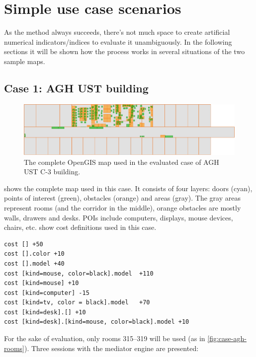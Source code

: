 \chapter{Simple use case scenarios}
\label{cha:examples}

As the method always succeeds, there's not much space to create artificial numerical indicators/indices to evaluate it unambiguously. In the following sections it will be shown how the process works in several situations of the two sample maps.

\section{Case 1: AGH UST building}
\label{sec:case-agh}

\begin{figure}
	\centering
	\includegraphics[width=\textwidth]{case-agh-complete}
	\caption{The complete OpenGIS map used in the evaluated case of AGH UST C-3 building.}
	\label{fig:case-agh-complete}
\end{figure}

 shows the complete map used in this case. It consists of four layers: doors (cyan), points of interest (green), obstacles (orange) and areas (gray). The gray areas represent rooms (and the corridor in the middle), orange obstacles are mostly walls, drawers and desks. POIs include computers, displays, mouse devices, chairs, etc.  show cost definitions used in this case.

\begin{lstlisting}[caption={Costs definitions used in the evaluated case..},label=lst:case-agh-costs]
cost [] +50
cost [].color +10
cost [].model +40
cost [kind=mouse, color=black].model  +110
cost [kind=mouse] +10
cost [kind=computer] -15
cost [kind=tv, color = black].model   +70
cost [kind=desk].[] +10
cost [kind=desk].[kind=mouse, color=black].model +10
\end{lstlisting}

For the sake of evaluation, only rooms 315--319 will be used (as in \cref{fig:case-agh-rooms}). Three sessions with the mediator engine are presented:

